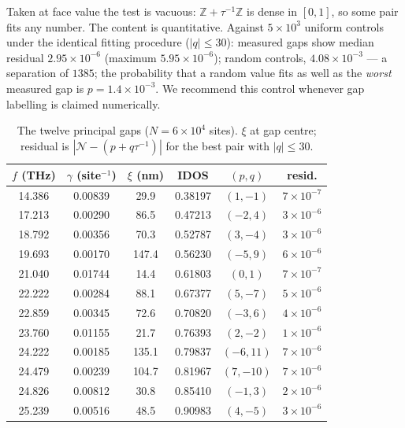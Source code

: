 \documentclass[aps,prl,preprint,superscriptaddress,longbibliography]{revtex4-2}
\begin{document}
Taken at face value the test is vacuous: $\mathbb{Z} + \tau^{-1}\mathbb{Z}$
is dense in $[0,1]$, so some pair fits any number. The content is
quantitative. Against $5\times10^3$ uniform controls under the identical
fitting procedure ($|q| \le 30$): measured gaps show median residual
$2.95\times10^{-6}$ (maximum $5.95\times10^{-6}$); random controls,
$4.08\times10^{-3}$ --- a separation of $1385$; the probability that a
random value fits as well as the \emph{worst} measured gap is
$p = 1.4\times10^{-3}$. We recommend this control whenever gap labelling is
claimed numerically.

\begin{table}[t]
\caption{\label{tab:gaps}The twelve principal gaps ($N = 6\times10^4$
sites). $\xi$ at gap centre; residual is
$|\mathcal{N} - (p + q\tau^{-1})|$ for the best pair with $|q| \le 30$.}
\begin{ruledtabular}
\begin{tabular}{cccccc}
$f$ (THz) & $\gamma$ (site$^{-1}$) & $\xi$ (nm) & IDOS & $(p,q)$ & resid.\\
\hline
14.386 & 0.00839 & 29.9 & 0.38197 & $(1,-1)$ & $7{\times}10^{-7}$\\
17.213 & 0.00290 & 86.5 & 0.47213 & $(-2,4)$ & $3{\times}10^{-6}$\\
18.792 & 0.00356 & 70.3 & 0.52787 & $(3,-4)$ & $3{\times}10^{-6}$\\
19.693 & 0.00170 & 147.4 & 0.56230 & $(-5,9)$ & $6{\times}10^{-6}$\\
21.040 & 0.01744 & 14.4 & 0.61803 & $(0,1)$ & $7{\times}10^{-7}$\\
22.222 & 0.00284 & 88.1 & 0.67377 & $(5,-7)$ & $5{\times}10^{-6}$\\
22.859 & 0.00345 & 72.6 & 0.70820 & $(-3,6)$ & $4{\times}10^{-6}$\\
23.760 & 0.01155 & 21.7 & 0.76393 & $(2,-2)$ & $1{\times}10^{-6}$\\
24.222 & 0.00185 & 135.1 & 0.79837 & $(-6,11)$ & $7{\times}10^{-6}$\\
24.479 & 0.00239 & 104.7 & 0.81967 & $(7,-10)$ & $7{\times}10^{-6}$\\
24.826 & 0.00812 & 30.8 & 0.85410 & $(-1,3)$ & $2{\times}10^{-6}$\\
25.239 & 0.00516 & 48.5 & 0.90983 & $(4,-5)$ & $3{\times}10^{-6}$\\
\end{tabular}
\end{ruledtabular}
\end{table}
\end{document}

